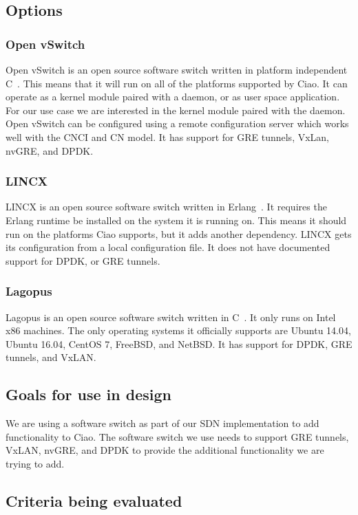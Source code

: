 \documentclass[10pt,letterpaper,onecolumn,journal]{IEEEtran}
\begin{document}
\subsection{Options}
\subsubsection{Open vSwitch}
Open vSwitch is an open source software switch written in platform independent C~\cite{ovs-readme}.
This means that it will run on all of the platforms supported by Ciao.
It can operate as a kernel module paired with a daemon, or as user space application.
For our use case we are interested in the kernel module paired with the daemon.
Open vSwitch can be configured using a remote configuration server which works well with the CNCI and CN model.
It has support for GRE tunnels, VxLan, nvGRE, and DPDK.

\subsubsection{LINCX}
LINCX is an open source software switch written in Erlang~\cite{lincx}.
It requires the Erlang runtime be installed on the system it is running on.
This means it should run on the platforms Ciao supports, but it adds another dependency.
LINCX gets its configuration from a local configuration file.
It does not have documented support for DPDK, or GRE tunnels.

\subsubsection{Lagopus}
Lagopus is an open source software switch written in C~\cite{lagopus}.
It only runs on Intel x86 machines.
The only operating systems it officially supports are Ubuntu 14.04, Ubuntu 16.04, CentOS 7, FreeBSD, and NetBSD.
It has support for DPDK, GRE tunnels, and VxLAN.

\subsection{Goals for use in design}
We are using a software switch as part of our SDN implementation to add functionality to Ciao.
The software switch we use needs to support GRE tunnels, VxLAN, nvGRE, and DPDK to provide the additional functionality we are trying to add.

\subsection{Criteria being evaluated}
\end{document}
